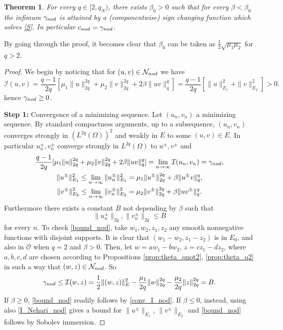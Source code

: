 \documentclass[10pt,a4paper]{amsart}
\numberwithin{equation}{section}
\newtheorem{theorem}[theo]{Theorem}
\begin{document}
\setcounter{theo}{4}
\begin{theorem}\label{thm:existence_ nodal}
For every $q\in [2,q_N)$, there exists $\beta_0>0$ such that  for every
$\beta < \beta_0$ the infimum $\gamma_{\rm nod}$
is attained by a (componentwise) sign changing function which solves \eqref{S}.
In particular $c_{\rm nod}=\gamma_{\rm nod}$.
\end{theorem}

By going through the proof, it becomes clear that $\beta_0$  can be taken as
$\frac{1}2\sqrt{\mu_1\mu_2}$ for $q>2$.


\begin{proof}
We begin by noticing that for $(u,v)\in \mathcal N_{\rm nod}$ we have
 \begin{equation} \label{I_Nehari_nod}
 \mathcal I(u,v)=\frac{q-1}{2q}\left[ \mu_1 \|u\|_{2q}^{2q}
 + \mu_2\|v\|_{2q}^{2q}  +2\beta \|uv\|_q^q \right]
 = \frac{q-1}{2q}\left[  \|u\|_{E_1}^{2} + \|v\|_{E_2}^{2} \right]  >0.
 \end{equation}
hence $\gamma_{\rm nod}\ge 0$.
\smallskip

\noindent\textbf{Step 1:} Convergence of a minimizing sequence.
Let $(u_n,v_n)$ a minimizing sequence. By standard compactness arguments, up to a
subsequence,  $(u_n,v_n)$ converges strongly in $(L^{2q}(\Omega))^2$ and weakly in $E$
to some  $(u,v) \in E$.
 In particular $u^{\pm}_n, v^{\pm}_n$ converge strongly in $L^{2q}(\Omega) $ to
 $u^{\pm}, v^{\pm}$ and
\begin{gather}
  \label{conv_I_nod}
  \frac{q-1}{2q}[ \mu_1 \|u\|_{2q}^{2q} + \mu_2\|v\|_{2q}^{2q}
  +2\beta \|uv\|_q^q]
= \lim_{n\to\infty} \mathcal I(u_n,v_n) =\gamma_{\rm nod} ,\\
\label{Fatou1}
  \|u^{\pm}\|_{E_1}^2 \le \lim_{n\to\infty} \|u^{\pm}_n\|_{E_1}^2
  =    \mu_1 \|u^{\pm}\|_{2q}^{2q} + \beta \|u^{\pm}v\|_q^q , \\
\label{Fatou2}
  \|v^{\pm}\|_{E_2}^2 \le \lim_{n\to\infty} \|v^{\pm}_n\|_{E_2}^2 =
 \mu_2 \|v^{\pm}\|_{2q}^{2q} + \beta \|uv^{\pm}\|_q^q .
 \end{gather}
Furthermore there exists a constant $B$ not depending by $\beta$ such that
\begin{equation}\label{bound_nod}
  \|u^{\pm}_n\|_{2q}, \|v^{\pm}_n\|_{2q}\le B
\end{equation}
for every $n$.
To check \eqref{bound_nod}, take $w_1, w_2, z_1, z_2$ any smooth nonnegative functions
with disjoint supports.
It is clear that  $(w_1-w_2, z_1-z_2)$ is in $E_0$, and also in $\mathcal O$ when
$q=2$ and $\beta>0$. Then, let  $w=aw_1-bw_2$, $z=cz_1-dz_2$, where $a,b,c,d$ are
chosen according to Propositions \ref{prop:theta_qnot2}, \ref{prop:theta_q2} in such
a way that $(w,z)\in\mathcal N_{\rm nod}$. So
 \[
\gamma_{\rm nod} \le \mathcal I(w,z)
= \frac{1}2\|(w,z) \|_E^2 - \frac{\mu_1}{2q}\|w\|_{2q}^{2q} -
 \frac{\mu_2}{2q}\|z\|_{2q}^{2q} =B.
 \]
If $\beta \ge 0$, \eqref{bound_nod} readily  follows by  \eqref{conv_I_nod}.
If $\beta \le 0$, instead, using also \eqref{I_Nehari_nod} gives a bound for
$\|u^{\pm}\|_{E_1}$, $\|v^{\pm}\|_{E_2}$ and  \eqref{bound_nod} follows by
Sobolev immersion.
\smallskip


\end{proof}
\end{document}
